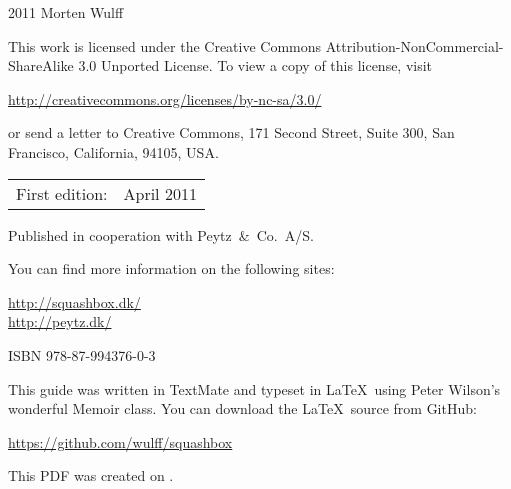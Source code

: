 \begingroup
\footnotesize
\setlength{\parindent}{0pt}
\setlength{\parskip}{\baselineskip}

\textcopyright{} 2011 Morten Wulff

This work is licensed under the Creative Commons Attribution-NonCom\-mercial-ShareAlike 3.0 Unported License. To view a copy of this license, visit

\url{http://creativecommons.org/licenses/by-nc-sa/3.0/}

or send a letter to Creative Commons, 171 Second Street, Suite 300, San Francisco, California, 94105, USA.

\begin{center}
\begin{tabular}{ll}
First edition: & April 2011 \\
\end{tabular}
\end{center}

Published in cooperation with Peytz~\&~Co.\ A/S.

You can find more information on the following sites:

\url{http://squashbox.dk/} \\
\url{http://peytz.dk/}

\vspace{2\baselineskip}

ISBN 978-87-994376-0-3

\vspace{2\baselineskip}

This guide was written in TextMate and typeset in \LaTeX~using Peter Wilson's wonderful Memoir class. You can download the \LaTeX~source from GitHub:

\url{https://github.com/wulff/squashbox}

\vspace{2\baselineskip}

This PDF was created on \thedate.

\endgroup

\thispagestyle{empty}

\clearpage

